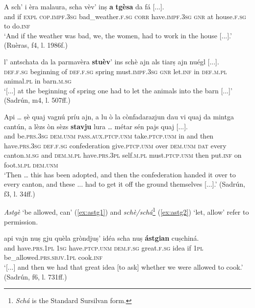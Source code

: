 \ea
\label{ex:vajda3}
\gll A sch’ i èra malaura, scha vèv’ inṣ \textbf{a} \textbf{tgèsa} da fá [...].\\
and if \textsc{expl} \textsc{cop.impf.3sg} bad\_weather.\textsc{f.sg} \textsc{corr} have.\textsc{impf.3sg} \textsc{gnr} at house.\textsc{f.sg} to do.\textsc{inf} \\
\glt `And if the weather was bad, we, the women, had to work in the house [...].' (Ruèras, f4, l. 1986f.)
\z

\ea
\label{ex:stuaj1}
\gll  [...] l’ antschata da la parmavèra \textbf{stuèv}’ ins schè ajn als tiarṣ ajn nuégl [...]. \\
{} \textsc{def.f.sg} beginning of \textsc{def.f.sg} spring must.\textsc{impf.3sg} \textsc{gnr} let.\textsc{inf} in \textsc{def.m.pl} animal.\textsc{pl} in barn.\textsc{m.sg}\\
\glt `[...] at the beginning of spring one had to let the animals into the barn [...]' (Sadrún, m4, l. 507ff.)
\z

\ea
\label{ex:stuaj2}
\gll Api … ṣè quaj vagnú príu ajn, a lu ò la cònfadarazjun dau vi quaj da mintga cantún, a lèzs òn sèzs \textbf{stavju} lura … métar sén pajs quaj [...].\\
and {} be.\textsc{prs.3sg} \textsc{dem.unm} \textsc{pass.aux.ptcp.unm} take.\textsc{ptcp.unm} in and then have.\textsc{prs.3sg} \textsc{def.f.sg} confederation give.\textsc{ptcp.unm} over \textsc{dem.unm} \textsc{dat} every canton.\textsc{m.sg} and \textsc{dem.m.pl} have.\textsc{prs.3pl} self.\textsc{m.pl} must.\textsc{ptcp.unm} then {} put.\textsc{inf} on foot.\textsc{m.pl} \textsc{dem.unm}\\
\glt `Then … this has been adopted, and then the confederation handed it over to every canton, and these ... had  to get it off the ground themselves [...].' (Sadrún, f3, l. 34ff.)
\z

\textit{Astgè} `be allowed, can' (\ref{ex:astg1}) and \textit{schè/schá}\footnote{\textit{Schá} is the Standard Sursilvan form.} (\ref{ex:astg2}) `let, allow' refer to permission.

\ea
\label{ex:astg1}
\gll[...] api vajn nuṣ gju quèla gròndjuṣ’ idéa scha nuṣ \textbf{ástgian} cuṣchiná.\\
{} and have.\textsc{prs.1pl} \textsc{1sg} have.\textsc{ptcp.unm} \textsc{dem.f.sg} great.\textsc{f.sg} idea if \textsc{1pl} be\_allowed.\textsc{prs.sbjv.1pl} cook.\textsc{inf}\\
\glt `[...] and then we had that great idea [to ask] whether we were allowed to cook.' (Sadrún, f6, l. 731ff.)
\z

